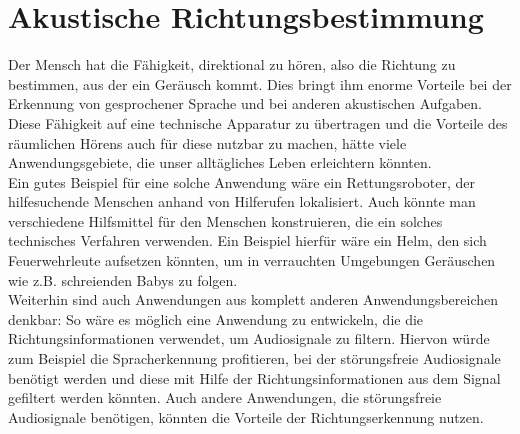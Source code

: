 \section{Akustische Richtungsbestimmung} Der Mensch hat die Fähigkeit, direktional zu hören, also die Richtung zu bestimmen, aus der ein Geräusch kommt. Dies bringt ihm enorme Vorteile bei der Erkennung von gesprochener Sprache und bei anderen akustischen Aufgaben. Diese Fähigkeit auf eine technische Apparatur zu übertragen und die Vorteile des räumlichen Hörens auch für diese nutzbar zu machen, hätte viele Anwendungsgebiete, die unser alltägliches Leben erleichtern könnten.\\
Ein gutes Beispiel für eine solche Anwendung wäre ein Rettungsroboter, der hilfesuchende Menschen anhand von Hilferufen lokalisiert. Auch könnte man verschiedene Hilfsmittel für den Menschen konstruieren, die ein solches technisches Verfahren verwenden. Ein Beispiel hierfür wäre ein Helm, den sich Feuerwehrleute aufsetzen könnten, um in verrauchten Umgebungen Geräuschen wie z.B. schreienden Babys zu folgen.\\
Weiterhin sind auch Anwendungen aus komplett anderen Anwendungsbereichen denkbar: So wäre es möglich eine Anwendung zu entwickeln, die die Richtungsinformationen verwendet, um Audiosignale zu filtern. Hiervon würde zum Beispiel die Spracherkennung profitieren, bei der  störungsfreie Audiosignale benötigt werden und diese mit Hilfe der Richtungsinformationen aus dem Signal gefiltert werden könnten\cite{Spracherkennung}. Auch andere Anwendungen, die störungsfreie Audiosignale benötigen, könnten die Vorteile der Richtungserkennung nutzen. 
